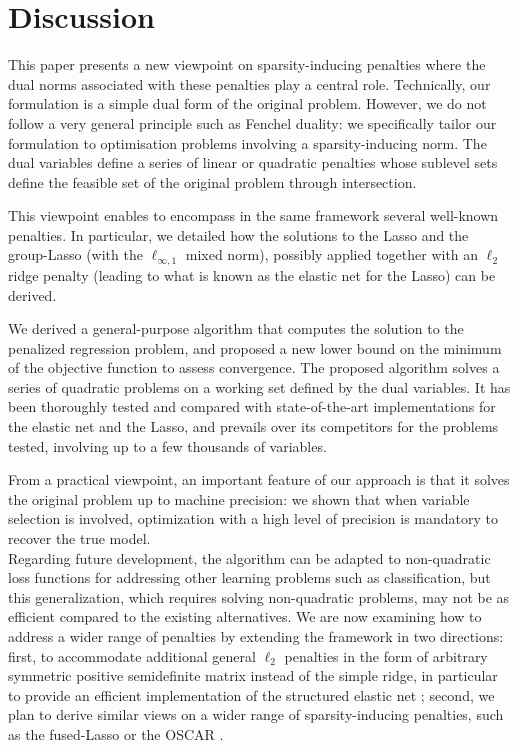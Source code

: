 \section{Discussion}


This paper presents a new viewpoint on sparsity-inducing penalties
where the dual norms associated with these penalties play a central role. 
Technically, our formulation is a simple dual form of the original problem. 
However, we do not follow a very general principle such as Fenchel duality: 
we specifically tailor our formulation to optimisation problems involving a 
sparsity-inducing norm.
The dual variables define a series of linear or quadratic penalties whose 
sublevel sets define the feasible set of the original problem through
intersection.

This  viewpoint  enables  to  encompass in the same framework  several
well-known penalties. In particular, we detailed how the solutions to the Lasso and the
group-Lasso (with the $\ell_{\infty,1}$  mixed norm), possibly applied
together with an  $\ell_2$ ridge penalty (leading to what  is known as
the elastic net for the Lasso) can be derived. 

We derived a  general-purpose algorithm that computes the solution to
the penalized regression problem,  and proposed a new lower
bound  on the  minimum  of  the objective  function to
assess convergence.  The proposed  algorithm solves a series of
quadratic  problems on a working set defined  by the dual  variables.   
It has  been
thoroughly tested  and compared with  state-of-the-art implementations
for the elastic net and the Lasso, and prevails over its competitors for 
the problems tested, involving  up to a few thousands of variables.

From a  practical viewpoint, an  important feature of our  approach is
that it solves the original problem  up to machine precision: we shown
that when  variable selection  is involved,  optimization with  a high
level of precision is mandatory to recover the true model.
\\

Regarding  future  development,  the   algorithm  can  be  adapted  to
non-quadratic loss  functions for  addressing other  learning problems
such  as  classification,  but  this  generalization,  which  requires
solving non-quadratic  problems, may not  be as efficient  compared to
the  existing alternatives.   We are  now examining  how to  address a
wider range of penalties by extending the framework in two directions:
first,  to accommodate  additional general  $\ell_2$ penalties  in the
form of  arbitrary symmetric  positive semidefinite matrix  instead of
the simple ridge, in particular to provide an efficient implementation
of the  structured elastic  net \citep{2010_AOS_Slawski} ;  second, we
plan to  derive similar  views on a  wider range  of sparsity-inducing
penalties, such as the fused-Lasso or the OSCAR \citep{Bondell08}.
